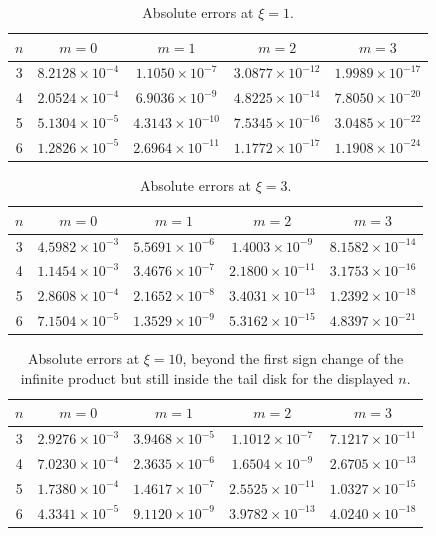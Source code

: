 \documentclass[11pt]{article}
\theoremstyle{definition}
\theoremstyle{remark}
\begin{document}
\begin{table}[ht]
\centering
\caption{Absolute errors at \(\xi=1\).}
\label{tab:error1}
\begin{tabular}{ccccc}
\toprule
\(n\)&\(m=0\)&\(m=1\)&\(m=2\)&\(m=3\)\\
\midrule
3 & \(8.2128\!\times10^{-4}\) & \(1.1050\!\times10^{-7}\) & \(3.0877\!\times10^{-12}\) & \(1.9989\!\times10^{-17}\)\\
4 & \(2.0524\!\times10^{-4}\) & \(6.9036\!\times10^{-9}\) & \(4.8225\!\times10^{-14}\) & \(7.8050\!\times10^{-20}\)\\
5 & \(5.1304\!\times10^{-5}\) & \(4.3143\!\times10^{-10}\) & \(7.5345\!\times10^{-16}\) & \(3.0485\!\times10^{-22}\)\\
6 & \(1.2826\!\times10^{-5}\) & \(2.6964\!\times10^{-11}\) & \(1.1772\!\times10^{-17}\) & \(1.1908\!\times10^{-24}\)\\
\bottomrule
\end{tabular}
\end{table}

\begin{table}[ht]
\centering
\caption{Absolute errors at \(\xi=3\).}
\label{tab:error3}
\begin{tabular}{ccccc}
\toprule
\(n\)&\(m=0\)&\(m=1\)&\(m=2\)&\(m=3\)\\
\midrule
3 & \(4.5982\!\times10^{-3}\) & \(5.5691\!\times10^{-6}\) & \(1.4003\!\times10^{-9}\) & \(8.1582\!\times10^{-14}\)\\
4 & \(1.1454\!\times10^{-3}\) & \(3.4676\!\times10^{-7}\) & \(2.1800\!\times10^{-11}\) & \(3.1753\!\times10^{-16}\)\\
5 & \(2.8608\!\times10^{-4}\) & \(2.1652\!\times10^{-8}\) & \(3.4031\!\times10^{-13}\) & \(1.2392\!\times10^{-18}\)\\
6 & \(7.1504\!\times10^{-5}\) & \(1.3529\!\times10^{-9}\) & \(5.3162\!\times10^{-15}\) & \(4.8397\!\times10^{-21}\)\\
\bottomrule
\end{tabular}
\end{table}

\begin{table}[ht]
\centering
\caption{Absolute errors at \(\xi=10\), beyond the first sign change of the
infinite product but still inside the tail disk for the displayed \(n\).}
\label{tab:error10}
\begin{tabular}{ccccc}
\toprule
\(n\)&\(m=0\)&\(m=1\)&\(m=2\)&\(m=3\)\\
\midrule
3 & \(2.9276\!\times10^{-3}\) & \(3.9468\!\times10^{-5}\) & \(1.1012\!\times10^{-7}\) & \(7.1217\!\times10^{-11}\)\\
4 & \(7.0230\!\times10^{-4}\) & \(2.3635\!\times10^{-6}\) & \(1.6504\!\times10^{-9}\) & \(2.6705\!\times10^{-13}\)\\
5 & \(1.7380\!\times10^{-4}\) & \(1.4617\!\times10^{-7}\) & \(2.5525\!\times10^{-11}\) & \(1.0327\!\times10^{-15}\)\\
6 & \(4.3341\!\times10^{-5}\) & \(9.1120\!\times10^{-9}\) & \(3.9782\!\times10^{-13}\) & \(4.0240\!\times10^{-18}\)\\
\bottomrule
\end{tabular}
\end{table}
\end{document}
